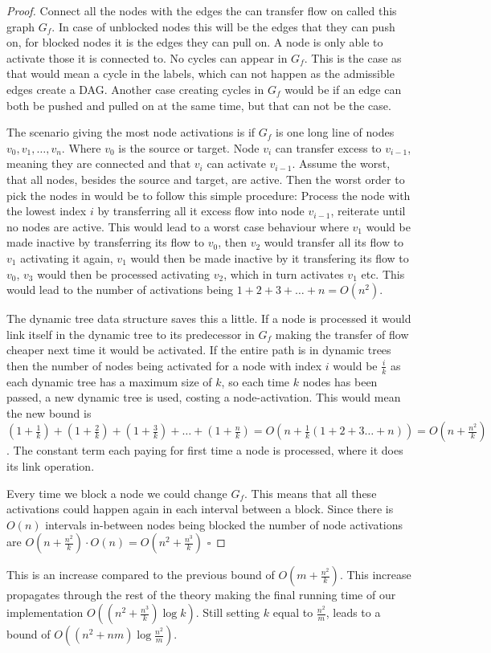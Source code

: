 \begin{proof}
	Connect all the nodes with the edges the can transfer flow on called this graph $G_f$. 
	In case of unblocked nodes this will be the edges that they can push on,
	for blocked nodes it is the edges they can pull on. A node is only able to activate those it is connected to. 
	No cycles can appear in $G_f$. This is the case as that would mean a cycle in the labels, which can not happen as the admissible edges create a DAG.
	Another case creating cycles in $G_f$ would be if an edge can both be pushed and pulled on at the same time, but that can not be the case.
	
	The scenario giving the most node activations is if $G_f$ is one long line of nodes $v_0,v_1,\dots,v_n$. Where $v_0$ is the source or target.
	Node $v_i$ can transfer excess to $v_{i-1}$, meaning they are connected and that $v_i$ can activate $v_{i-1}$. Assume the worst, that all nodes, besides
	the source and target, are active. Then the worst order to pick the nodes in would be to follow this simple procedure:
	Process the node with the lowest index $i$ by transferring all it excess flow into node $v_{i-1}$, reiterate until no nodes are active.
	This would lead to a worst case behaviour where $v_1$ would be made inactive by transferring its flow to $v_0$, 
	then $v_2$ would transfer all its flow to $v_1$ activating it again, $v_1$ would then be made inactive by it transfering its flow to $v_0$, $v_3$ would then be processed activating 
	$v_2$, which in turn activates $v_1$ etc.
	This would lead to the number of activations being $1+2+3+\dots+n = O(n^2)$. 
	
	The dynamic tree data structure saves this a little. If a node
	is processed it would link itself in the dynamic tree to its predecessor in $G_f$ making the transfer of flow cheaper next time it would be activated.
	If the entire path is in dynamic trees then the number of nodes being activated for a node with index $i$ would be $\frac{i}{k}$ as each dynamic
	tree has a maximum size of $k$, so each time $k$ nodes has been passed, a new dynamic tree is used, costing a node-activation. This would mean
	the new bound is $(1+\frac{1}{k})+(1+\frac{2}{k})+(1+\frac{3}{k})+\dots+(1+\frac{n}{k}) = O(n + \frac{1}{k}(1+2+3\dots+n)) = O(n + \frac{n^2}{k})$. 
	The constant term each paying for first time a node is processed, where it does its link operation. 
	
	Every time we block a node we could change $G_f$. This means that all these activations could happen again in each interval between a block.
	Since there is $O(n)$ intervals in-between nodes being blocked the number of node activations are $O(n + \frac{n^2}{k}) \cdot O(n) = O(n^2 + \frac{n^3}{k})$
	$\square$
\end{proof}
This is an increase compared to the previous bound of $O(m + \frac{n^2}{k})$. This increase propagates through the rest of the theory making the final
running time of our implementation $O((n^2+\frac{n^3}{k})\log{k})$. Still setting $k$ equal to $\frac{n^2}{m}$, leads to a bound of
$O\left((n^2 + nm)\log{\frac{n^2}{m}}\right)$. 

